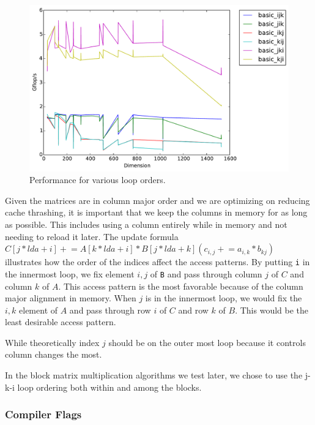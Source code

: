 \documentclass[12pt]{article}
\begin{document}
\begin{center}
\begin{figure}[h]
\includegraphics[width=6in]{timing_basiclooporders_comparison.pdf}
	\caption{Performance for various loop orders.}
	\label{fig:LoopOrders}
\end{figure}
\end{center}

Given the matrices are in column major order and we are optimizing on reducing cache thrashing, it is important that we keep the columns in memory for as long as possible.
This includes using a column entirely while in memory and not needing to reload it later.
The update formula $C[j*lda+i] \mathrel{+}= A[k*lda+i] * B[j*lda+k] (c_{i,j} \mathrel{+}= a_{i,k} * b_{kj})$ illustrates how the order of the indices affect the access patterns.
By putting \texttt{i} in the innermost loop, we fix element $i,j$ of \texttt{B} and pass through column $j$ of $C$ and column $k$ of $A$.
This access pattern is the most favorable because of the column major alignment in memory.
When $j$ is in the innermost loop, we would fix the $i,k$ element of $A$ and pass through row $i$ of $C$ and row $k$ of $B$. This would be the least desirable access pattern.

While theoretically index $j$ should be on the outer most loop because it controls column changes the most.  

In the block matrix multiplication algorithms we test later, we chose to use the j-k-i loop ordering both within and among the blocks.

\subsubsection{Compiler Flags}
\end{document}
